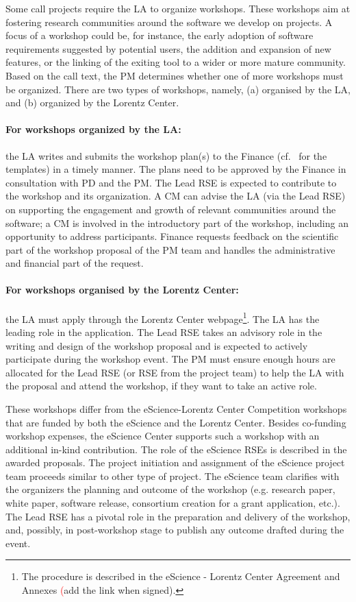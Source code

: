 Some call projects require the LA to organize workshops. These workshops aim at fostering research communities around
the software we develop on projects. A focus of a workshop could be, for instance, the early adoption of software
requirements suggested by potential users, the addition and expansion of new features, or the linking of the exiting
tool to a wider or more mature community. Based on the call text, the PM determines whether one of more workshops must
be organized. There are two types of workshops, namely, (a) organised by the LA, and (b) organized by the Lorentz Center.
%
\paragraph{For workshops organized by the LA:} the LA writes and submits the workshop plan(s) to the Finance (cf.~\cite{proj-templates} 
for the templates) in a timely manner. The plans need to be approved by the Finance in consultation with PD and the PM. The
Lead RSE is expected to contribute to the workshop and its organization. A CM can advise the LA (via the Lead RSE) on
supporting the engagement and growth of relevant communities around the software; a CM is involved in the introductory
part of the workshop, including an opportunity to address participants. Finance requests feedback on the scientific part 
of the workshop proposal of the PM team and handles the administrative and financial part of the request. 
%
\paragraph{For workshops organised by the Lorentz Center:} the LA must apply through the Lorentz Center webpage\footnote{The
procedure is described in the eScience - Lorentz Center Agreement and Annexes {\textcolor{red}(add the link when signed)}.}.
%
The LA has the leading role in the application. The Lead RSE takes an advisory role in the writing and design of the
workshop proposal and is expected to actively participate during the workshop event. The PM must ensure enough hours
are allocated for the Lead RSE (or RSE from the project team) to help the LA with the proposal and attend the workshop,
if they want to take an active role.

These workshops differ from the eScience-Lorentz Center Competition workshops that are funded by both the eScience and
the Lorentz Center. Besides co-funding workshop expenses, the eScience Center supports such a workshop with an
additional in-kind contribution. The role of the eScience RSEs is described in the awarded proposals. The project
initiation and assignment of the eScience project team proceeds similar to other type of project. The eScience team
clarifies with the organizers the planning and outcome of the workshop (e.g. research paper, white paper, software
release, consortium creation for a grant application, etc.). The Lead RSE has a pivotal role in the preparation and
delivery of the workshop, and, possibly, in post-workshop stage to publish any outcome drafted during the event. 

